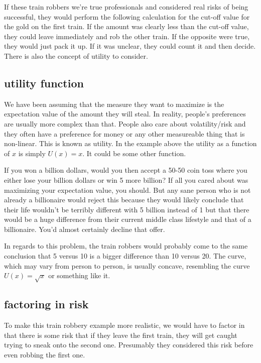 \documentclass[12pt]{article}
\begin{document}
If these train robbers we're true professionals and considered real risks of being successful, they would perform 
the following calculation for the cut-off value for the gold on the first train. If the amount was clearly less than the
cut-off value, they could leave immediately and rob the other train. If the opposite were true, they would just pack it up.
If it was unclear, they could count it and then decide. There is also the concept of utility to consider.

\subsection{utility function}

We have been assuming that the measure they want to maximize is the expectation value of the amount they will
steal. In reality, people's preferences are usually more complex than that. People also care about volatility/risk 
and they often have a preference for money or any other measureable thing that is non-linear. This is known
as utility. In the example above the utility as a function of $x$ is simply $U(x) = x$. It could be some 
other function. 

If you won a billion dollars, would you then accept a 50-50 coin toss where 
you either lose your billion dollars or win 5 more billion?  
If all you cared about was maximizing your expectation value, you should. But any sane person who is not already
a billionaire would reject this because they would likely conclude that their life wouldn't be terribly different 
with 5 billion instead of 1 but that there would be a huge difference from their current middle class lifestyle and
that of a billionaire. You'd almost certainly decline that offer.  

In regards to this problem, the train robbers would probably come to the same conclusion that 5 versus 10 is a 
bigger difference than 10 versus 20. The curve, which may vary from person to person, 
is usually concave, resembling the curve $U(x) = \sqrt{x}$ or something like it.   

\subsection{factoring in risk}

To make this train robbery example more realistic, we would have to factor in that there is some risk that
if they leave the first train, they will get caught trying to sneak onto the second one. Presumably they
considered this risk before even robbing the first one.  
\end{document}
